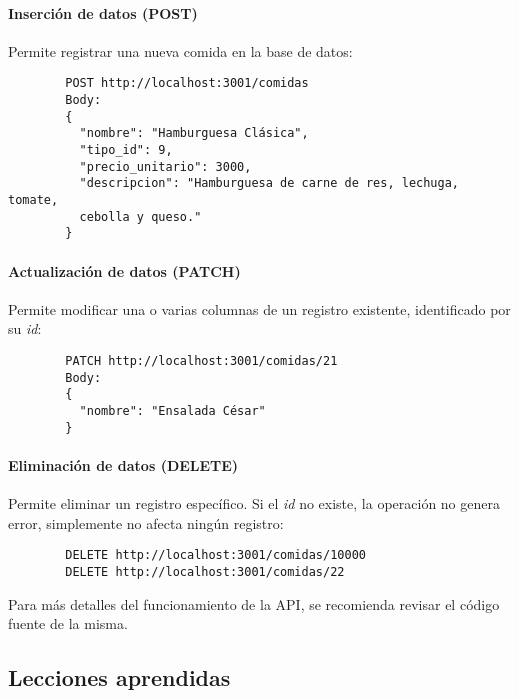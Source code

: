 \paragraph{Inserción de datos (POST)}  
Permite registrar una nueva comida en la base de datos: 
    \begin{verbatim}
        POST http://localhost:3001/comidas
        Body:
        {
          "nombre": "Hamburguesa Clásica",
          "tipo_id": 9,
          "precio_unitario": 3000,
          "descripcion": "Hamburguesa de carne de res, lechuga, tomate, 
          cebolla y queso."
        }
\end{verbatim}

\paragraph{Actualización de datos (PATCH)}  
Permite modificar una o varias columnas de un registro existente, identificado por su \emph{id}:  
\begin{verbatim}
        PATCH http://localhost:3001/comidas/21
        Body:
        {
          "nombre": "Ensalada César"
        }
\end{verbatim}

\paragraph{Eliminación de datos (DELETE)}  
Permite eliminar un registro específico. Si el \emph{id} no existe, la operación no genera error, simplemente no afecta ningún registro:
\begin{verbatim}
        DELETE http://localhost:3001/comidas/10000
        DELETE http://localhost:3001/comidas/22
\end{verbatim}

Para más detalles del funcionamiento de la API, se recomienda revisar el código fuente de la misma. 

\subsection{Lecciones aprendidas}

